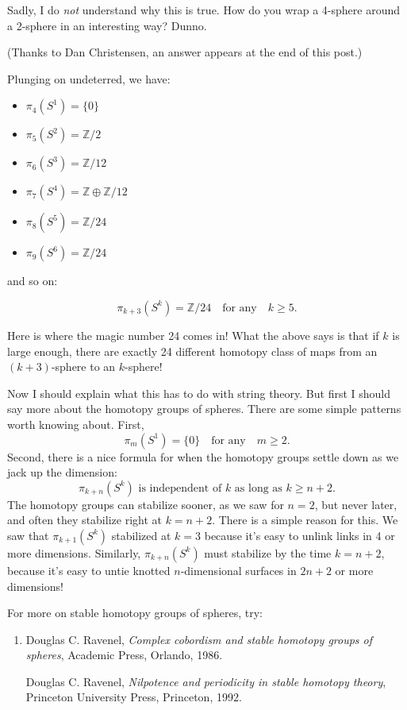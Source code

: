 \documentclass{article}
\def\tightlist{}
\begin{document}
Sadly, I do \emph{not} understand why this is true. How do you wrap a
4-sphere around a 2-sphere in an interesting way? Dunno.

(Thanks to Dan Christensen, an answer appears at the end of this post.)

Plunging on undeterred, we have:

\begin{itemize}
\tightlist
\item
  \(\pi_4(S^1) = \{0\}\)
\item
  \(\pi_5(S^2) = \mathbb{Z}/2\)
\item
  \(\pi_6(S^3) = \mathbb{Z}/12\)
\item
  \(\pi_7(S^4) = \mathbb{Z}\oplus\mathbb{Z}/12\)
\item
  \(\pi_8(S^5) = \mathbb{Z}/24\)
\item
  \(\pi_9(S^6) = \mathbb{Z}/24\)
\end{itemize}

and so on:

\[\pi_{k+3}(S^k) = \mathbb{Z}/24 \quad\text{for any}\quad k\geqslant 5.\]

Here is where the magic number 24 comes in! What the above says is that
if \(k\) is large enough, there are exactly 24 different homotopy class
of maps from an \((k+3)\)-sphere to an \(k\)-sphere!

Now I should explain what this has to do with string theory. But first I
should say more about the homotopy groups of spheres. There are some
simple patterns worth knowing about. First,
\[\pi_m(S^1) = \{0\} \quad\text{for any}\quad m\geqslant 2.\] Second,
there is a nice formula for when the homotopy groups settle down as we
jack up the dimension:
\[\mbox{$\pi_{k+n}(S^k)$ is independent of $k$ as long as $k\geqslant n+2$.}\]
The homotopy groups can stabilize sooner, as we saw for \(n = 2\), but
never later, and often they stabilize right at \(k = n+2\). There is a
simple reason for this. We saw that \(\pi_{k+1}(S^k)\) stabilized at
\(k = 3\) because it's easy to unlink links in 4 or more dimensions.
Similarly, \(\pi_{k+n}(S^k)\) must stabilize by the time \(k = n+2\),
because it's easy to untie knotted \(n\)-dimensional surfaces in
\(2n+2\) or more dimensions!

For more on stable homotopy groups of spheres, try:

\begin{enumerate}
\def\labelenumi{\arabic{enumi})}
\setcounter{enumi}{1}
\item
  Douglas C. Ravenel, \emph{Complex cobordism and stable homotopy groups
  of spheres}, Academic Press, Orlando, 1986.

  Douglas C. Ravenel, \emph{Nilpotence and periodicity in stable
  homotopy theory}, Princeton University Press, Princeton, 1992.
\end{enumerate}
\end{document}
